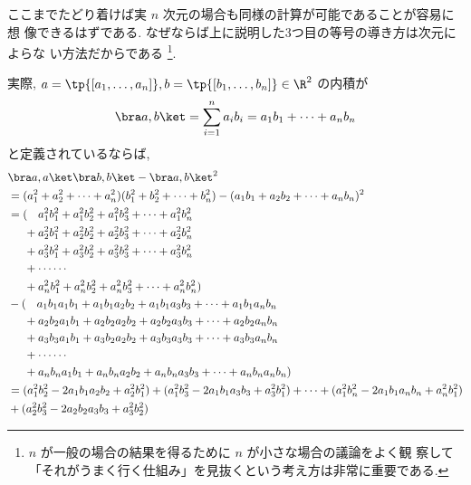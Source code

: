 \documentclass[12pt,twoside]{jarticle}
\begin{document}
ここまでたどり着けば実 $n$ 次元の場合も同様の計算が可能であることが容易に想
像できるはずである. なぜならば上に説明した3つ目の等号の導き方は次元によらな
い方法だからである%
\footnote{$n$ が一般の場合の結果を得るために $n$ が小さな場合の議論をよく観
  察して「それがうまく行く仕組み」を見抜くという考え方は非常に重要である.}.

実際, $a=\tp{[a_1,\dots,a_n]}, b=\tp{[b_1,\dots,b_n]} \in\R^2$ の内積が
\begin{equation*}
  \bra a,b\ket = \sum_{i=1}^n a_ib_i = a_1b_1 + \cdots + a_nb_n
\end{equation*}
と定義されているならば,
{\small
\begin{align*}
  &
  \bra a,a\ket \bra b,b\ket - \bra a,b\ket^2
  \\ 
  &
  = (a_1^2 + a_2^2 + \cdots + a_n^2)(b_1^2 + b_2^2 + \cdots + b_n^2) 
  - (a_1b_1 + a_2b_2 + \cdots + a_nb_n)^2
  \\ &
  = ( \hphantom{+\,}
    a_1^2b_1^2 + a_1^2b_2^2 + a_1^2b_3^2 + \cdots + a_1^2b_n^2
  \\ &
  \hphantom{= (} 
  + a_2^2b_1^2 + a_2^2b_2^2 + a_2^2b_3^2 + \cdots + a_2^2b_n^2
  \\ &
  \hphantom{= (} 
  + a_3^2b_1^2 + a_3^2b_2^2 + a_3^2b_3^2 + \cdots + a_3^2b_n^2
  \\ &
  \hphantom{= (} 
  + \cdots\cdots
  \\ &
  \hphantom{= (} 
  + a_n^2b_1^2 + a_n^2b_2^2 + a_n^2b_3^2 + \cdots + a_n^2b_n^2
  ) 
  \\ &
  - ( \hphantom{+\,}
    a_1b_1a_1b_1 + a_1b_1a_2b_2 + a_1b_1a_3b_3 + \cdots + a_1b_1a_nb_n
  \\ &
  \hphantom{= (} 
  + a_2b_2a_1b_1 + a_2b_2a_2b_2 + a_2b_2a_3b_3 + \cdots + a_2b_2a_nb_n
  \\ &
  \hphantom{= (} 
  + a_3b_3a_1b_1 + a_3b_2a_2b_2 + a_3b_3a_3b_3 + \cdots + a_3b_3a_nb_n
  \\ &
  \hphantom{= (} 
  + \cdots\cdots
  \\ &
  \hphantom{= (} 
  + a_nb_na_1b_1 + a_nb_na_2b_2 + a_nb_na_3b_3 + \cdots + a_nb_na_nb_n
  ) 
  \\ &
  = (a_1^2b_2^2 - 2a_1b_1a_2b_2 + a_2^2b_1^2)
  + (a_1^2b_3^2 - 2a_1b_1a_3b_3 + a_3^2b_1^2)
  + \cdots
  + (a_1^2b_n^2 - 2a_1b_1a_nb_n + a_n^2b_1^2)
  \\ &
  + (a_2^2b_3^2 - 2a_2b_2a_3b_3 + a_3^2b_2^2)

\end{align*}}
\end{document}
